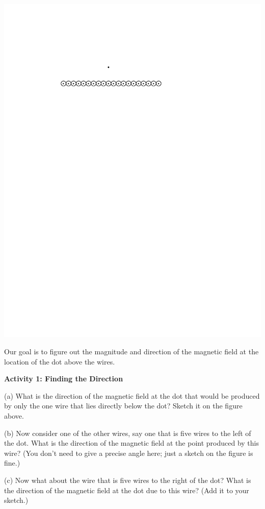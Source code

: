 \centerline{\includegraphics{amperes_law_infinite_sheet/wires_with_dot.pdf}}

\bigskip\bigskip

Our goal is to figure out the magnitude and direction of the magnetic field
at the location of the dot above the wires.

\textbf{Activity 1: Finding the Direction}


(a) What is the direction of the magnetic
field at the dot that would be produced by only the one wire that lies directly below
the dot?  Sketch it on the figure above.

(b) Now consider one of the other wires,
say one that is five wires to the left of the dot.
What is the direction of the magnetic field at the point produced by this 
wire? (You don't need to give a precise angle here; just a sketch on the figure is fine.)

(c) Now what about the wire that is five wires to the right of the dot?
What is the direction of the magnetic field at the dot due to this wire?  (Add it to your sketch.)

